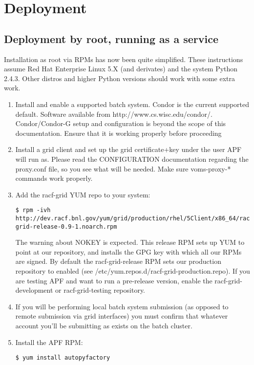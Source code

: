 \documentclass[a4paper]{jpconf}
\begin{document}
\section{Deployment}

\subsection{Deployment by root, running as a service}

Installation as root via RPMs has now been quite simplified. 
These instructions assume Red Hat Enterprise Linux 5.X (and derivates) and the system Python 2.4.3. 
Other distros and higher Python versions should work with some extra work.

\begin{enumerate}
\item Install and enable a supported batch system. 
Condor is the current supported default. 
Software available from http://www.cs.wisc.edu/condor/.
Condor/Condor-G setup and configuration is beyond the scope of this documentation. Ensure that it is working properly before proceeding
\item Install a grid client and set up the grid certificate+key under the user APF will run as. 
Please read the CONFIGURATION documentation regarding the proxy.conf file, so you see what will be needed. 
Make sure voms-proxy-* commands work properly.
\item Add the racf-grid YUM repo to your system:
\begin{verbatim}
$ rpm -ivh http://dev.racf.bnl.gov/yum/grid/production/rhel/5Client/x86_64/racf-grid-release-0.9-1.noarch.rpm
\end{verbatim}
The warning about NOKEY is expected. 
This release RPM sets up YUM to point at our repository, 
and installs the GPG key with which all our RPMs are signed. 
By default the racf-grid-release RPM sets our production repository to enabled 
(see /etc/yum.repos.d/racf-grid-production.repo). 
If you are testing APF and want to run a pre-release version, enable the racf-grid-development or racf-grid-testing repository.
\item If you will be performing local batch system submission 
(as opposed to remote submission via grid interfaces) 
you must confirm that whatever account you'll be submitting as exists on the batch cluster.
\item Install the APF RPM:
\begin{verbatim}
$ yum install autopyfactory
\end{verbatim}

\end{enumerate}
\end{document}
